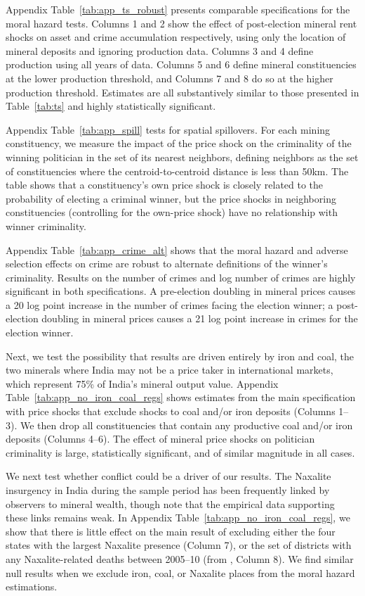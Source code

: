 \documentclass[12pt,letterpaper]{article}
\begin{document}
Appendix Table~\ref{tab:app_ts_robust} presents comparable
specifications for the moral hazard tests. Columns 1 and 2 show the
effect of post-election mineral rent shocks on asset and crime
accumulation respectively, using only the location of mineral deposits
and ignoring production data. Columns 3 and 4 define production using
all years of data. Columns 5 and 6 define mineral constituencies at
the lower production threshold, and Columns 7 and 8 do so at the
higher production threshold. Estimates are all substantively similar
to those presented in Table~\ref{tab:ts} and highly statistically
significant.

Appendix Table~\ref{tab:app_spill} tests for spatial spillovers. For
each mining constituency, we measure the impact of the price shock on
the criminality of the winning politician in the set of its nearest
neighbors, defining neighbors as the set of constituencies where the
centroid-to-centroid distance is less than 50km. The table shows that a
constituency's own price shock is closely related to the probability
of electing a criminal winner, but the price shocks in neighboring
constituencies (controlling for the own-price shock) have no
relationship with winner criminality.

Appendix Table~\ref{tab:app_crime_alt} shows that the moral hazard and
adverse selection effects on crime are robust to alternate definitions
of the winner's criminality. Results on the number of crimes and log
number of crimes are highly significant in both specifications. A
pre-election doubling in mineral prices causes a 20 log point increase
in the number of crimes facing the election winner; a post-election
doubling in mineral prices causes a 21 log point increase in crimes
for the election winner.

Next, we test the possibility that results are driven entirely by iron
and coal, the two minerals where India may not be a price taker in
international markets, which represent 75\% of India's mineral
output value. Appendix Table~\ref{tab:app_no_iron_coal_regs} shows estimates
from the main specification with price shocks that exclude shocks to
coal and/or iron deposits (Columns 1--3). We then drop all
constituencies that contain any productive coal and/or iron deposits
(Columns 4--6). The effect of mineral price shocks on politician
criminality is large, statistically significant, and of similar
magnitude in all cases.

We next test whether conflict could be a driver of our results.  The
Naxalite insurgency in India during the sample period has been
frequently linked by observers to mineral wealth, though
 note that the empirical data supporting these
links remains weak. In Appendix Table~\ref{tab:app_no_iron_coal_regs},
we show that there is little effect on the main result of excluding
either the four states with the largest Naxalite presence (Column 7),
or the set of districts with any Naxalite-related deaths between 2005--10
(from , Column 8). We find similar null results
when we exclude iron, coal, or Naxalite places from the moral hazard
estimations.
\end{document}
